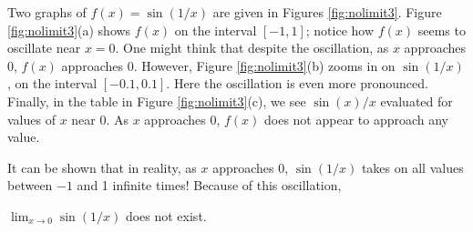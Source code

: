 %
{%
Two graphs of $f(x) = \sin(1/x)$ are given in Figures \ref{fig:nolimit3}. Figure \ref{fig:nolimit3}(a) shows $f(x)$ on the interval $[-1,1]$; notice how $f(x)$ seems to oscillate near $x=0$. One might think that despite the oscillation, as $x$ approaches 0, $f(x)$ approaches 0. However, Figure \ref{fig:nolimit3}(b) zooms in on $\sin(1/x)$, on the interval $[-0.1,0.1]$. Here the oscillation is even more pronounced. Finally, in the table in Figure \ref{fig:nolimit3}(c), we see $\sin(x)/x$ evaluated for values of $x$ near 0. As $x$ approaches 0, $f(x)$ does not appear to approach any value. 

It can be shown that in reality, as $x$ approaches 0, $\sin(1/x)$ takes on all values between $-1$ and 1 infinite times! Because of this oscillation,


 $\lim_{x\to 0}\sin(1/x)$ does not exist.}\\

